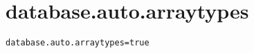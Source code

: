 \section{database.auto.arraytypes}
\label{configuration:DatabaseAutoArraytypes}
\ClearAPI
\TODO
{}
\begin{lstlisting}[style=Props,caption={Usage example for \textit{database.auto.arraytypes}}]
database.auto.arraytypes=true
\end{lstlisting}